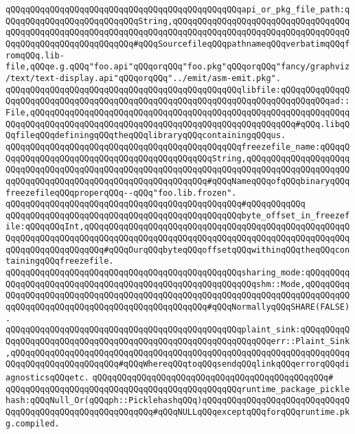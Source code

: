 \verb|qQQqqQQqqQQqqQQqqQQqqQQqqQQqqQQqqQQqqQQqqQQqqQQqapi_or_pkg_file_path:qQQqqQQqqQQqqQQqqQQqqQQqqQQqString,qQQqqQQqqQQqqQQqqQQqqQQqqQQqqQQqqQQqqQQqqQQqqQQqqQQqqQQqqQQqqQQqqQQqqQQqqQQqqQQqqQQqqQQqqQQqqQQqqQQqqQQqqQQqqQQqqQQqqQQqqQQqqQQqqQQq#qQQqSourcefileqQQqpathnameqQQqverbatimqQQqfromqQQq.lib-file,qQQqe.g.qQQq"foo.api"qQQqorqQQq"foo.pkg"qQQqorqQQq"fancy/graphviz/text/text-display.api"qQQqorqQQq"../emit/asm-emit.pkg".|\newline
\verb|qQQqqQQqqQQqqQQqqQQqqQQqqQQqqQQqqQQqqQQqqQQqqQQqlibfile:qQQqqQQqqQQqqQQqqQQqqQQqqQQqqQQqqQQqqQQqqQQqqQQqqQQqqQQqqQQqqQQqqQQqqQQqqQQqqQQqad::File,qQQqqQQqqQQqqQQqqQQqqQQqqQQqqQQqqQQqqQQqqQQqqQQqqQQqqQQqqQQqqQQqqQQqqQQqqQQqqQQqqQQqqQQqqQQqqQQqqQQqqQQqqQQqqQQqqQQqqQQqqQQq#qQQq.libqQQqfileqQQqdefiningqQQqtheqQQqlibraryqQQqcontainingqQQqus.|\newline
\verb|qQQqqQQqqQQqqQQqqQQqqQQqqQQqqQQqqQQqqQQqqQQqqQQqfreezefile_name:qQQqqQQqqQQqqQQqqQQqqQQqqQQqqQQqqQQqqQQqqQQqqQQqString,qQQqqQQqqQQqqQQqqQQqqQQqqQQqqQQqqQQqqQQqqQQqqQQqqQQqqQQqqQQqqQQqqQQqqQQqqQQqqQQqqQQqqQQqqQQqqQQqqQQqqQQqqQQqqQQqqQQqqQQqqQQqqQQqqQQq#qQQqNameqQQqofqQQqbinaryqQQqfreezefileqQQqproperqQQq--qQQq"foo.lib.frozen".|\newline
\verb|qQQqqQQqqQQqqQQqqQQqqQQqqQQqqQQqqQQqqQQqqQQqqQQq#qQQqqQQqqQQq|\newline
\verb|qQQqqQQqqQQqqQQqqQQqqQQqqQQqqQQqqQQqqQQqqQQqqQQqbyte_offset_in_freezefile:qQQqqQQqInt,qQQqqQQqqQQqqQQqqQQqqQQqqQQqqQQqqQQqqQQqqQQqqQQqqQQqqQQqqQQqqQQqqQQqqQQqqQQqqQQqqQQqqQQqqQQqqQQqqQQqqQQqqQQqqQQqqQQqqQQqqQQqqQQqqQQqqQQqqQQqqQQq#qQQqOurqQQqbyteqQQqoffsetqQQqwithinqQQqtheqQQqcontainingqQQqfreezefile.|\newline
\verb|qQQqqQQqqQQqqQQqqQQqqQQqqQQqqQQqqQQqqQQqqQQqqQQqsharing_mode:qQQqqQQqqQQqqQQqqQQqqQQqqQQqqQQqqQQqqQQqqQQqqQQqqQQqqQQqqQQqshm::Mode,qQQqqQQqqQQqqQQqqQQqqQQqqQQqqQQqqQQqqQQqqQQqqQQqqQQqqQQqqQQqqQQqqQQqqQQqqQQqqQQqqQQqqQQqqQQqqQQqqQQqqQQqqQQqqQQqqQQqqQQq#qQQqNormallyqQQqSHARE(FALSE).|\newline
\verb|qQQqqQQqqQQqqQQqqQQqqQQqqQQqqQQqqQQqqQQqqQQqqQQqplaint_sink:qQQqqQQqqQQqqQQqqQQqqQQqqQQqqQQqqQQqqQQqqQQqqQQqqQQqqQQqqQQqqQQqerr::Plaint_Sink,qQQqqQQqqQQqqQQqqQQqqQQqqQQqqQQqqQQqqQQqqQQqqQQqqQQqqQQqqQQqqQQqqQQqqQQqqQQqqQQqqQQqqQQqqQQq#qQQqWhereqQQqtoqQQqsendqQQqlinkqQQqerrorqQQqdiagnosticsqQQqetc.|\newline
\verb|qQQqqQQqqQQqqQQqqQQqqQQqqQQqqQQqqQQqqQQqqQQqqQQq#|\newline
\verb|qQQqqQQqqQQqqQQqqQQqqQQqqQQqqQQqqQQqqQQqqQQqqQQqruntime_package_picklehash:qQQqNull_Or(qQQqph::PicklehashqQQq)qQQqqQQqqQQqqQQqqQQqqQQqqQQqqQQqqQQqqQQqqQQqqQQqqQQqqQQqqQQq#qQQqNULLqQQqexceptqQQqforqQQqruntime.pkg.compiled.|\newline
